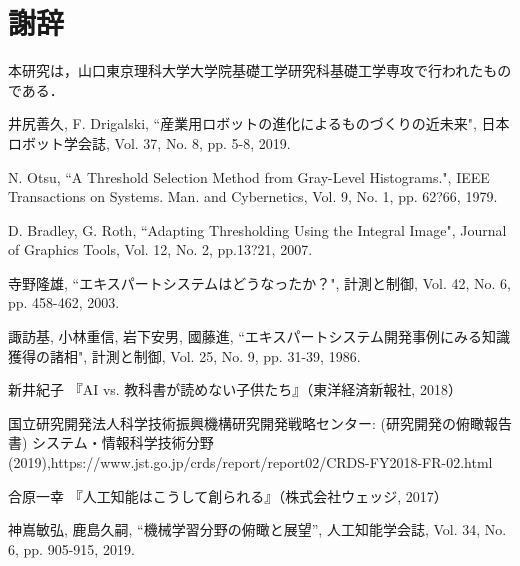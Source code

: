 \documentclass{suribt}
\begin{document}
\chapter{謝辞}%
本研究は，山口東京理科大学大学院基礎工学研究科基礎工学専攻で行われたものである．
\begin{thebibliography}{}%
井尻善久, F. Drigalski, ``産業用ロボットの進化によるものづくりの近未来", 日本ロボット学会誌, Vol. 37, No. 8, pp. 5-8, 2019.

N. Otsu, ``A Threshold Selection Method from Gray-Level Histograms.", IEEE Transactions on Systems. Man. and Cybernetics, Vol. 9, No. 1, pp. 62?66, 1979.

D. Bradley, G. Roth, ``Adapting Thresholding Using the Integral Image", Journal of Graphics Tools, Vol. 12, No. 2, pp.13?21, 2007.

寺野隆雄, ``エキスパートシステムはどうなったか？", 計測と制御, Vol. 42, No. 6, pp. 458-462, 2003.

諏訪基, 小林重信, 岩下安男, 國藤進, ``エキスパートシステム開発事例にみる知識獲得の諸相", 計測と制御, Vol. 25, No. 9, pp. 31-39, 1986.

新井紀子 『AI vs. 教科書が読めない子供たち』（東洋経済新報社, 2018）

国立研究開発法人科学技術振興機構研究開発戦略センター: (研究開発の俯瞰報告書) システム・情報科学技術分野 (2019),https://www.jst.go.jp/crds/report/report02/CRDS-FY2018-FR-02.html

合原一幸 『人工知能はこうして創られる』（株式会社ウェッジ, 2017）

神嶌敏弘, 鹿島久嗣, ``機械学習分野の俯瞰と展望'', 人工知能学会誌, Vol. 34, No. 6, pp. 905-915, 2019.

\end{thebibliography}
\end{document}
